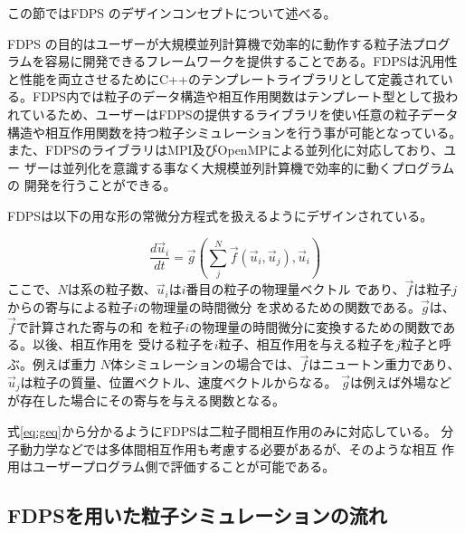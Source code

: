 \documentclass[a4j]{jarticle}
\newcommand{\myvec}[1]{\vec{#1}}
\begin{document}
この節ではFDPS のデザインコンセプトについて述べる。

FDPS の目的はユーザーが大規模並列計算機で効率的に動作する粒子法プログ
ラムを容易に開発できるフレームワークを提供することである。FDPSは汎用性
と性能を両立させるためにC++のテンプレートライブラリとして定義されてい
る。FDPS内では粒子のデータ構造や相互作用関数はテンプレート型として扱わ
れているため、ユーザーはFDPSの提供するライブラリを使い任意の粒子データ
構造や相互作用関数を持つ粒子シミュレーションを行う事が可能となっている。
また、FDPSのライブラリはMPI及びOpenMPによる並列化に対応しており、ユー
ザーは並列化を意識する事なく大規模並列計算機で効率的に動くプログラムの
開発を行うことができる。


FDPSは以下の用な形の常微分方程式を扱えるようにデザインされている。

\begin{equation}
  \frac{d\myvec{u}_i}{dt} = \myvec{g}\left(\sum_j^N \myvec{f}
  (\myvec{u}_i, \myvec{u}_j), \myvec{u}_i\right) \label{eq:geq}
\end{equation}
ここで、$N$は系の粒子数、$\myvec{u}_i$は$i$番目の粒子の物理量ベクトル
であり、$\myvec{f}$は粒子$j$からの寄与による粒子$i$の物理量の時間微分
を求めるための関数である。$\myvec{g}$は、$\myvec{f}$で計算された寄与の和
を粒子$i$の物理量の時間微分に変換するための関数である。以後、相互作用を
受ける粒子を$i$粒子、相互作用を与える粒子を$j$粒子と呼ぶ。例えば重力
$N$体シミュレーションの場合では、$\myvec{f}$はニュートン重力であり、
$\myvec{u}_j$は粒子の質量、位置ベクトル、速度ベクトルからなる。
$\myvec{g}$は例えば外場などが存在した場合にその寄与を与える関数となる。

式\ref{eq:geq}から分かるようにFDPSは二粒子間相互作用のみに対応している。
分子動力学などでは多体間相互作用も考慮する必要があるが、そのような相互
作用はユーザープログラム側で評価することが可能である。



\subsection{FDPSを用いた粒子シミュレーションの流れ}
\end{document}
